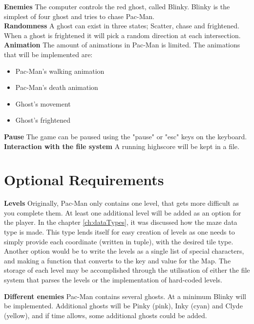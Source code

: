 \documentclass[11pt]{Article}
\begin{document}
\noindent \textbf{Enemies} The computer controls the red ghost, called Blinky. Blinky is the simplest of four ghost and tries to chase Pac-Man.\\

\noindent \textbf{Randomness} A ghost can exist in three states; Scatter, chase and frightened. When a ghost is frightened it will pick a random direction at each intersection.\\

\noindent \textbf{Animation} The amount of animations in Pac-Man is limited. The animations that will be implemented are:
\begin{itemize}
  \item Pac-Man's walking animation
  \item Pac-Man's death animation
  \item Ghost's movement
  \item Ghost's frightened\\
\end{itemize}

\noindent \textbf{Pause} The game can be paused using the "pause" or "esc" keys on the keyboard.\\

\noindent \textbf{Interaction with the file system} A running highscore will be kept in a file.\\


\newpage
\section{Optional Requirements} \label{ch:optionalRequirements}

\textbf{Levels} Originally, Pac-Man only contains one level, that gets more difficult as you complete them. At least one additional level will be added as an option for the player. In the chapter \ref{ch:dataTypes}, it was discussed how the maze data type is made. This type lends itself for easy creation of levels as one needs to simply provide each coordinate (written in tuple), with the desired tile type. Another option would be to write the levels as a single list of special characters, and making a function that converts to the key and value for the Map. The storage of each level may be accomplished through the utilisation of either the file system that parses the levels or the implementation of hard-coded levels.

\textbf{Different enemies} Pac-Man contains several ghosts. At a minimum Blinky will be implemented. Additional ghosts will be Pinky (pink), Inky (cyan) and Clyde (yellow), and if time allows, some additional ghosts could be added.
\end{document}
